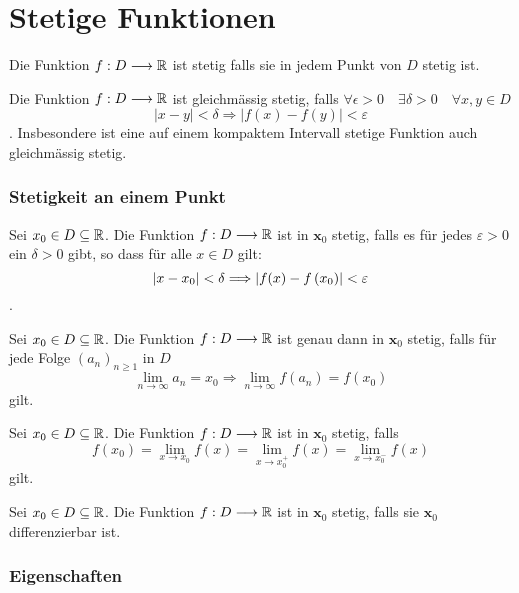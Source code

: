 \part{Stetige Funktionen}
\setcounter{section}{0}
\Def Die Funktion $f: D \longrightarrow \mathbb{R}$ ist stetig falls sie in jedem Punkt von $D$ stetig ist.

\Def Die Funktion $f: D \longrightarrow \mathbb{R}$ ist gleichmässig stetig, falls 
$\forall \epsilon > 0 \quad \exists\delta>0 \quad \forall x,y \in D$
$$|x-y|<\delta \Longrightarrow|f(x)-f(y)|<\varepsilon$$
. Insbesondere ist eine auf einem kompaktem Intervall stetige Funktion auch gleichmässig stetig.
\section{Stetigkeit an einem Punkt}

\Def[Epsilon] Sei $x_{0} \in D \subseteq \mathbb{R}$. Die Funktion $f: D \longrightarrow \mathbb{R}$ ist in $\boldsymbol{x}_{0}$ stetig, falls es für jedes $\varepsilon>0$ ein $\delta>0$ gibt, so dass für alle $x \in D$ gilt: $$\left\lvert x-x_{0} \right\rvert<\delta \Longrightarrow\left\lvert f(x)-f\left(x_{0}\right) \right\rvert<\varepsilon$$.

\Satz[Sequence] Sei $x_{0} \in D \subseteq \mathbb{R}$. Die Funktion $f: D \longrightarrow \mathbb{R}$ ist genau dann in $\boldsymbol{x}_{0}$ stetig, falls für jede Folge $\left(a_{n}\right)_{n \geqslant 1}$ in $D$
	$$\lim \limits_{n \rightarrow \infty} a_{n}=x_{0} \Longrightarrow \lim \limits_{n \rightarrow \infty} f\left(a_{n}\right)=f\left(x_{0}\right)$$ gilt.
	
\Satz[Sidewise] Sei $x_{0} \in D \subseteq \mathbb{R}$. Die Funktion $f: D \longrightarrow \mathbb{R}$ ist in $\boldsymbol{x}_{0}$ stetig, falls 
	$$f(x_0) =\lim \limits_{x \rightarrow x_0} f(x) =  \lim \limits_{x \rightarrow x_0^+} f(x) = \lim \limits_{x \rightarrow x_0^-} f(x)$$ gilt.	
	
\Satz[Differentiable] Sei $x_{0} \in D \subseteq \mathbb{R}$. Die Funktion $f: D \longrightarrow \mathbb{R}$ ist in $\boldsymbol{x}_{0}$ stetig, falls sie $\boldsymbol{x}_{0}$ differenzierbar ist.

\section{Eigenschaften}

